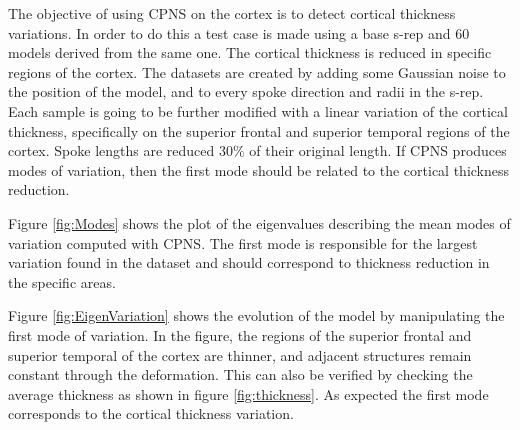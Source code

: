 \documentclass[a4paper,twoside]{article}
\begin{document}
The objective of using CPNS on the cortex is to detect cortical thickness variations.
In order to do this a test case is made using a base s-rep and 60 models derived from the same one.
The cortical thickness is reduced in specific regions of the cortex.
The datasets are created by adding some Gaussian noise to the position of the model, and to every spoke direction and radii in the s-rep. 
Each sample is going to be further modified with a linear variation of the cortical thickness,
specifically on the superior frontal and superior temporal regions of the cortex.
Spoke lengths are reduced $30\%$ of their original length.
If CPNS produces modes of variation, then the first mode should be related to the cortical thickness reduction.

Figure \ref{fig:Modes} shows the plot of the eigenvalues describing the mean modes of variation computed with CPNS.
The first mode is responsible for the largest variation found in the dataset and should correspond to 
thickness reduction in the specific areas. 

Figure \ref{fig:EigenVariation} shows the evolution of the model by manipulating the first mode of
variation. In the figure, the regions of the superior frontal
and superior temporal of the cortex are thinner, and adjacent structures remain constant through the deformation.
This can also be verified by checking the average thickness as shown in figure \ref{fig:thickness}.
As expected the first mode corresponds to the cortical thickness variation.

\begin{figure*}  
  \centering
  \caption[S-rep deformation using the first mode.]{Deforming the s-rep model using the first mode of variation and comparing it against the base s-rep.}
  \label{fig:EigenVariation}   
\end{figure*}
\end{document}
